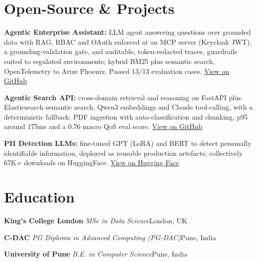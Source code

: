 \documentclass[10pt,a4paper]{article}
\newcommand{\sep}{\,\textcolor{accent!60}{\textbar}\,}
\begin{document}
\section{Open-Source \& Projects}
\begin{tight}
  \item \textbf{Agentic Enterprise Assistant:} LLM agent answering questions over grounded data with RAG, RBAC and OAuth enforced at an MCP server (Keycloak JWT), a grounding-validation gate, and auditable, token-redacted traces, guardrails suited to regulated environments; hybrid BM25 plus semantic search, OpenTelemetry to Arize Phoenix. Passed 13/13 evaluation cases. \href{https://github.com/abhijeetscode/Agentic-Enterprise-Assistant}{View on GitHub}
  \item \textbf{Agentic Search API:} cross-domain retrieval and reasoning on FastAPI plus Elasticsearch semantic search, Qwen3 embeddings and Claude tool-calling, with a deterministic fallback; PDF ingestion with auto-classification and chunking, p95 around 175ms and a 0.76 macro QoS eval score. \href{https://github.com/abhijeetscode/search-agent}{View on GitHub}
  \item \textbf{PII Detection LLMs:} fine-tuned GPT (LoRA) and BERT to detect personally identifiable information, deployed as reusable production artefacts; collectively 67K+ downloads on HuggingFace. \href{https://huggingface.co/ab-ai/pii_model}{View on Hugging Face}
\end{tight}

\section{Education}
{\color{company}\bfseries King's College London}\sep{\itshape MSc in Data Science}\hfill {\color{muted}London, UK}\par\vspace{1pt}
{\color{company}\bfseries C-DAC}\sep{\itshape PG Diploma in Advanced Computing (PG-DAC)}\hfill {\color{muted}Pune, India}\par\vspace{1pt}
{\color{company}\bfseries University of Pune}\sep{\itshape B.E. in Computer Science}\hfill {\color{muted}Pune, India}\par
\end{document}
